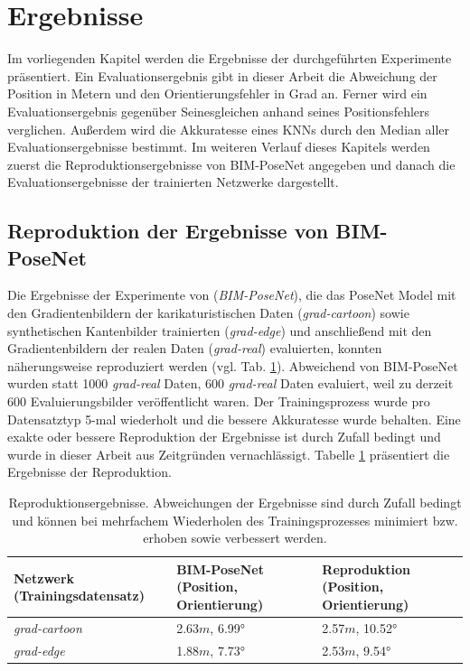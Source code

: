 
\section{Ergebnisse}
 \label{sec:kapitel_4}

Im vorliegenden Kapitel werden die Ergebnisse der durchgeführten Experimente präsentiert. Ein Evaluationsergebnis gibt in dieser Arbeit die Abweichung der Position in Metern und den Orientierungsfehler in Grad an. Ferner wird ein Evaluationsergebnis gegenüber Seinesgleichen anhand seines Positionsfehlers verglichen. Außerdem wird die Akkuratesse eines KNNs durch den Median aller Evaluationsergebnisse bestimmt. Im weiteren Verlauf dieses Kapitels werden zuerst die Reproduktionsergebnisse von BIM-PoseNet \cite{acharyaBIMPoseNetIndoorCamera2019} angegeben und danach die Evaluationsergebnisse der trainierten Netzwerke dargestellt.

\subsection{Reproduktion der Ergebnisse von BIM-PoseNet}
Die Ergebnisse der Experimente von \citet{acharyaBIMPoseNetIndoorCamera2019} (\textit{BIM-PoseNet}), die das PoseNet Model mit den Gradientenbildern der karikaturistischen Daten (\textit{grad-cartoon}) sowie synthetischen Kantenbilder trainierten (\textit{grad-edge}) und anschließend mit den Gradientenbildern der realen Daten (\textit{grad-real}) evaluierten, konnten näherungsweise reproduziert werden (vgl. Tab. \ref{tab:reproduction}). Abweichend von BIM-PoseNet wurden statt 1000 \textit{grad-real} Daten, 600 \textit{grad-real} Daten evaluiert, weil zu derzeit 600 Evaluierungsbilder veröffentlicht waren. Der Trainingsprozess wurde pro Datensatztyp 5-mal wiederholt und die bessere Akkuratesse wurde behalten. Eine exakte oder bessere Reproduktion der Ergebnisse ist durch Zufall bedingt und wurde in dieser Arbeit aus Zeitgründen vernachlässigt. Tabelle \ref{tab:reproduction} präsentiert die Ergebnisse der Reproduktion.


\begin{table}
	\centering
	\caption{Reproduktionsergebnisse. Abweichungen der Ergebnisse sind durch Zufall bedingt und können bei mehrfachem Wiederholen des Trainingsprozesses minimiert bzw. erhoben sowie verbessert werden. }
	\begin{tabularx}{1.0\textwidth}{X X X}
		\textbf{Netzwerk} \hspace{2cm} (Trainingsdatensatz) & \textbf{BIM-PoseNet} \hspace{2cm} (Position, Orientierung) & \textbf{Reproduktion} \hspace{2cm} (Position, Orientierung)\\
		\hline
	 \textit{grad-cartoon} & 2.63$m$, 6.99° & 2.57$m$, 10.52°\\
		\hline
		\textit{grad-edge} & 1.88$m$, 7.73° & 2.53$m$, 9.54°\\
	\end{tabularx}
	\label{tab:reproduction}
\end{table}






